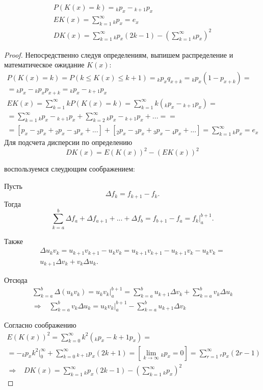 \begin{theorem}
	\begin{gather*}
		P(K(x) = k) = {}_kp_x - {}_{k+1}p_x\\
		EK(x) = \sum\limits^{\infty}_{k = 1}{}_kp_x = e_x\\
		DK(x) = \sum\limits^{\infty}_{k=1}{}_kp_x(2k-1) - (\sum\limits^{\infty}_{k=1}{}_kp_x)^2
	\end{gather*}
	
\end{theorem}

\begin{proof}
	Непосредственно следуя определениям, выпишем распределение и математическое ожидание $ K(x)$:
	\begin{gather*}
		P(K(x) = k) = P(k \leq K(x) \leq k+1) = {}_kp_xq_{x+k} = {}_kp_x(1 - p_{x+k}) = \\
		={}_kp_x - {}_kp_xp_{x+k} = {}_kp_x - {}_{k+1}p_x\\
		EK(x) = \sum\limits^{\infty}_{k=1}kP(K(x) = k) = \sum\limits^{\infty}_{k=1}k({}_kp_x - {}_{k+1}p_x) =\\
		= \sum\limits^{\infty}_{k=1}{}_kp_x - {}_{k+1}p_x + \sum\limits^{\infty}_{k=2}{}_kp_x - {}_{k+1}p_x + ...==\\
		= [p_x - {}_2p_x + {}_2p_x - {}_3p_x + ...] + [{}_2p_x - {}_3p_x +{}_3p_x - {}_4p_x + ...] = \sum\limits^{\infty}_{k = 1}{}_kp_x = e_x
	\end{gather*}
	Для подсчета дисперсии по определению
	\[DK(x) = E(K(x))^2 - (EK(x))^2 \]

	воспользуемся слеудющим соображением:
	\begin{mind}
		Пусть \[\Delta f_k = f_{k+1} - f_k. \]
		Тогда \[ \sum\limits^{b}_{k=a}\Delta f_a + \Delta f_{a+1} + ...+ \Delta f_b = f_{b+1} - f_a = f_k|^{b+1}_a. \]

		Также 
		\begin{gather*}
			\Delta u_kv_k = u_{k+1}v_{k+1} - u_kv_k = u_{k+1}v_{k+1}- u_{k+1}v_k - u_kv_k=\\
			u_{k+1}\Delta v_k + v_k\Delta u_k.
		\end{gather*}

		Отсюда
		\begin{gather*}
			\sum\limits_{k=a}^{b} \Delta(u_kv_k) = u_kv_k|^{b+1}_a = \sum\limits_{k=a}^{b}u_{k+1}\Delta v_k + \sum\limits_{k=a}^{b}v_k\Delta u_k\\
			\Rightarrow\;\;\; \sum\limits_{k=a}^{b}v_k\Delta u_k = u_kv_k|^{b+1}_a - \sum\limits_{k=a}^{b}u_{k+1}\Delta v_k
		\end{gather*}
	\end{mind}

	Согласно соображению
	\begin{gather*}
		E(K(x))^2 = \sum\limits_{k=0}^{\infty}k^2({}_kp_x - {k+1}p_x) =\\
		= -{}_kp_xk^2|^{\infty}_0 + \sum\limits_{k=0}^{\infty}{}_{k+1}p_x(2k +1)=[\lim\limits_{k\rightarrow \infty}{}_kp_x = 0] = \sum\limits_{r=1}^{\infty}{}_rp_x(2r-1)\\
		\Rightarrow \;\;\; DK(x) = \sum\limits_{k=1}^{\infty}{}_kp_x(2k-1) - (\sum\limits_{k=1}^{\infty}{}_kp_x)^2	
	\end{gather*}
\end{proof}
